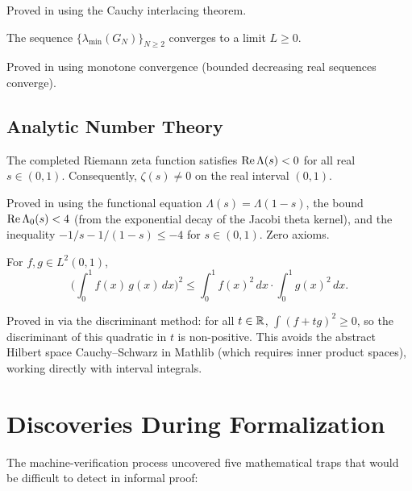 \documentclass[11pt,a4paper]{article}
\begin{document}
Proved in  using the Cauchy
interlacing theorem.

\begin{theorem}
\label{thm:eiglimit}
The sequence $\{\lambda_{\min}(G_N)\}_{N \geq 2}$ converges to a
limit $L \geq 0$.
\end{theorem}

Proved in  using monotone convergence
(bounded decreasing real sequences converge).

\subsection{Analytic Number Theory}

\begin{theorem}
\label{thm:theta}
The completed Riemann zeta function satisfies
$\operatorname{Re}\Lambda(s) < 0$ for all real $s \in (0,1)$. Consequently,
$\zeta(s) \neq 0$ on the real interval $(0,1)$.
\end{theorem}

Proved in  using the functional
equation $\Lambda(s) = \Lambda(1-s)$, the bound
$\operatorname{Re}\Lambda_0(s) < 4$ (from the exponential decay of the Jacobi
theta kernel), and the inequality $-1/s - 1/(1-s) \leq -4$
for $s \in (0,1)$. Zero axioms.

\begin{theorem}
\label{thm:csbd}
For $f, g \in L^2(0,1)$,
\[
  \biggl(\int_0^1 f(x)\,g(x)\,dx\biggr)^2 \leq
  \int_0^1 f(x)^2\,dx \cdot \int_0^1 g(x)^2\,dx.
\]
\end{theorem}

Proved in  via the discriminant method: for all
$t \in \mathbb{R}$, $\int(f + tg)^2 \geq 0$, so the discriminant of this
quadratic in $t$ is non-positive. This avoids the abstract Hilbert
space Cauchy--Schwarz in Mathlib (which requires inner product spaces),
working directly with interval integrals.

\section{Discoveries During Formalization}
\label{sec:traps}

The machine-verification process uncovered five mathematical traps
that would be difficult to detect in informal proof:
\end{document}
